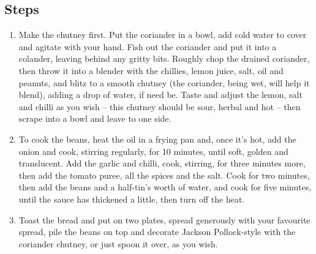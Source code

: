 \documentclass{book}
\begin{document}
\subsection*{Steps}
\begin{enumerate}
\item Make the chutney first. Put the coriander in a bowl, add cold water to cover and agitate with your hand. Fish out the coriander and put it into a colander, leaving behind any gritty bits. Roughly chop the drained coriander, then throw it into a blender with the chillies, lemon juice, salt, oil and peanuts, and blitz to a smooth chutney (the coriander, being wet, will help it blend), adding a drop of water, if need be. Taste and adjust the lemon, salt and chilli as you wish – this chutney should be sour, herbal and hot – then scrape into a bowl and leave to one side.
\item To cook the beans, heat the oil in a frying pan and, once it’s hot, add the onion and cook, stirring regularly, for 10 minutes, until soft, golden and translucent. Add the garlic and chilli, cook, stirring, for three minutes more, then add the tomato puree, all the spices and the salt. Cook for two minutes, then add the beans and a half-tin’s worth of water, and cook for five minutes, until the sauce has thickened a little, then turn off the heat.
\item Toast the bread and put on two plates, spread generously with your favourite spread, pile the beans on top and decorate Jackson Pollock-style with the coriander chutney, or just spoon it over, as you wish.
\end{enumerate}
\newpage
\end{document}
